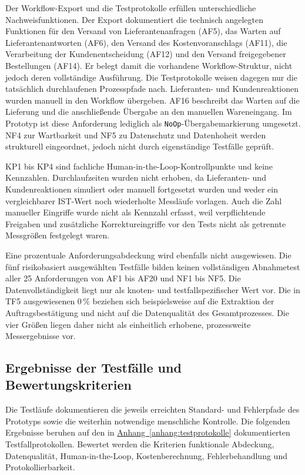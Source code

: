\documentclass[a4paper,12pt]{article}
\begin{document}
Der Workflow-Export und die Testprotokolle erfüllen unterschiedliche Nachweisfunktionen. Der Export dokumentiert die technisch angelegten Funktionen für den Versand von Lieferantenanfragen (AF5), das Warten auf Lieferantenantworten (AF6), den Versand des Kostenvoranschlags (AF11), die Verarbeitung der Kundenentscheidung (AF12) und den Versand freigegebener Bestellungen (AF14). Er belegt damit die vorhandene Workflow-Struktur, nicht jedoch deren vollständige Ausführung. Die Testprotokolle weisen dagegen nur die tatsächlich durchlaufenen Prozesspfade nach. Lieferanten- und Kundenreaktionen wurden manuell in den Workflow übergeben. AF16 beschreibt das Warten auf die Lieferung und die anschließende Übergabe an den manuellen Wareneingang. Im Prototyp ist diese Anforderung lediglich als \texttt{NoOp}-Übergabemarkierung umgesetzt. NF4 zur Wartbarkeit und NF5 zu Datenschutz und Datenhoheit werden strukturell eingeordnet, jedoch nicht durch eigenständige Testfälle geprüft.

KP1 bis KP4 sind fachliche Human-in-the-Loop-Kontrollpunkte und keine Kennzahlen. Durchlaufzeiten wurden nicht erhoben, da Lieferanten- und Kundenreaktionen simuliert oder manuell fortgesetzt wurden und weder ein vergleichbarer IST-Wert noch wiederholte Messläufe vorlagen. Auch die Zahl manueller Eingriffe wurde nicht als Kennzahl erfasst, weil verpflichtende Freigaben und zusätzliche Korrektureingriffe vor den Tests nicht als getrennte Messgrößen festgelegt waren.

Eine prozentuale Anforderungsabdeckung wird ebenfalls nicht ausgewiesen. Die fünf risikobasiert ausgewählten Testfälle bilden keinen vollständigen Abnahmetest aller 25 Anforderungen von AF1 bis AF20 und NF1 bis NF5. Die Datenvollständigkeit liegt nur als knoten- und testfallspezifischer Wert vor. Die in TF5 ausgewiesenen \(0\,\%\) beziehen sich beispielsweise auf die Extraktion der Auftragsbestätigung und nicht auf die Datenqualität des Gesamtprozesses. Die vier Größen liegen daher nicht als einheitlich erhobene, prozessweite Messergebnisse vor.

\subsection{Ergebnisse der Testfälle und Bewertungskriterien}
Die Testläufe dokumentieren die jeweils erreichten Standard- und Fehlerpfade des Prototyps sowie die weiterhin notwendige menschliche Kontrolle. Die folgenden Ergebnisse beruhen auf den in \hyperref[anhang:testprotokolle]{Anhang~\ref*{anhang:testprotokolle}} dokumentierten Testfallprotokollen. Bewertet werden die Kriterien funktionale Abdeckung, Datenqualität, Human-in-the-Loop, Kostenberechnung, Fehlerbehandlung und Protokollierbarkeit.
\end{document}
